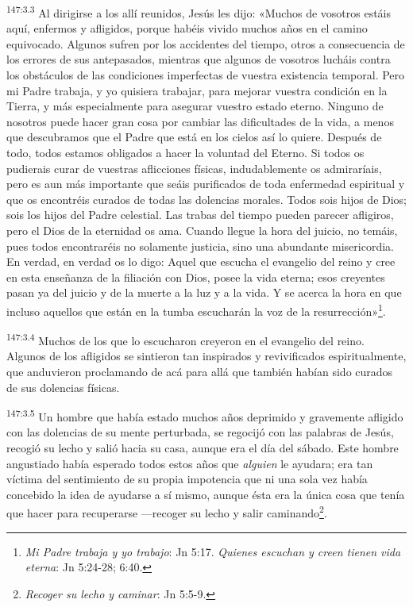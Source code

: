 \par
\textsuperscript{147:3.3} Al dirigirse a los allí reunidos, Jesús les dijo: «Muchos de vosotros estáis aquí, enfermos y afligidos, porque habéis vivido muchos años en el camino equivocado. Algunos sufren por los accidentes del tiempo, otros a consecuencia de los errores de sus antepasados, mientras que algunos de vosotros lucháis contra los obstáculos de las condiciones imperfectas de vuestra existencia temporal. Pero mi Padre trabaja, y yo quisiera trabajar, para mejorar vuestra condición en la Tierra, y más especialmente para asegurar vuestro estado eterno. Ninguno de nosotros puede hacer gran cosa por cambiar las dificultades de la vida, a menos que descubramos que el Padre que está en los cielos así lo quiere. Después de todo, todos estamos obligados a hacer la voluntad del Eterno. Si todos os pudierais curar de vuestras aflicciones físicas, indudablemente os admiraríais, pero es aun más importante que seáis purificados de toda enfermedad espiritual y que os encontréis curados de todas las dolencias morales. Todos sois hijos de Dios; sois los hijos del Padre celestial. Las trabas del tiempo pueden parecer afligiros, pero el Dios de la eternidad os ama. Cuando llegue la hora del juicio, no temáis, pues todos encontraréis no solamente justicia, sino una abundante misericordia. En verdad, en verdad os lo digo: Aquel que escucha el evangelio del reino y cree en esta enseñanza de la filiación con Dios, posee la vida eterna; esos creyentes pasan ya del juicio y de la muerte a la luz y a la vida. Y se acerca la hora en que incluso aquellos que están en la tumba escucharán la voz de la resurrección»\footnote{\textit{Mi Padre trabaja y yo trabajo}: Jn 5:17. \textit{Quienes escuchan y creen tienen vida eterna}: Jn 5:24-28; 6:40.}.

\par
\textsuperscript{147:3.4} Muchos de los que lo escucharon creyeron en el evangelio del reino. Algunos de los afligidos se sintieron tan inspirados y revivificados espiritualmente, que anduvieron proclamando de acá para allá que también habían sido curados de sus dolencias físicas.

\par
\textsuperscript{147:3.5} Un hombre que había estado muchos años deprimido y gravemente afligido con las dolencias de su mente perturbada, se regocijó con las palabras de Jesús, recogió su lecho y salió hacia su casa, aunque era el día del sábado. Este hombre angustiado había esperado todos estos años que \textit{alguien} le ayudara; era tan víctima del sentimiento de su propia impotencia que ni una sola vez había concebido la idea de ayudarse a sí mismo, aunque ésta era la única cosa que tenía que hacer para recuperarse ---recoger su lecho y salir caminando\footnote{\textit{Recoger su lecho y caminar}: Jn 5:5-9.}.

